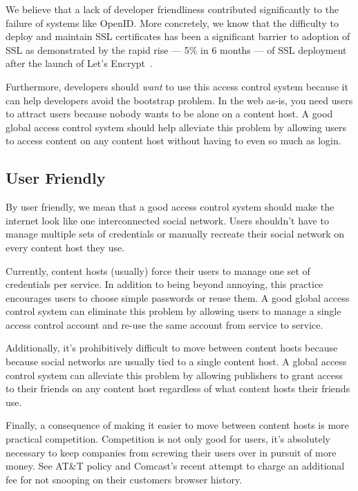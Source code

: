 \documentclass[pdftex,12pt,a4papaer]{report}
\begin{document}
We believe that a lack of developer friendliness contributed significantly to
the failure of systems like OpenID\cite{openid}. More concretely, we know that
the difficulty to deploy and maintain SSL certificates has been a significant
barrier to adoption of SSL as demonstrated by the rapid rise --- 5\% in 6 months
--- of SSL deployment after the launch of Let's Encrypt~\cite{lets-encrypt}.

Furthermore, developers should \emph{want} to use this access control system
because it can help developers avoid the bootstrap problem. In the web as-is,
you need users to attract users because nobody wants to be alone on a content
host. A good global access control system should help alleviate this problem by
allowing users to access content on any content host without having to even so
much as login.

\subsection{User Friendly}
\label{sub:goal-user}

By user friendly, we mean that a good access control system should make the
internet look like one interconnected social network. Users shouldn't have to
manage multiple sets of credentials or manually recreate their social network on
every content host they use.

Currently, content hosts (usually) force their users to manage one set of
credentials per service. In addition to being beyond annoying, this practice
encourages users to choose simple passwords or reuse them. A good global access
control system can eliminate this problem by allowing users to manage a single
access control account and re-use the same account from service to service.

Additionally, it's prohibitively difficult to move between content hosts because
because social networks are usually tied to a single content host. A global
access control system can alleviate this problem by allowing publishers to
grant access to their friends on any content host regardless of what content
hosts their friends use.

Finally, a consequence of making it easier to move between content hosts is
more practical competition. Competition is not only good for users, it's
absolutely necessary to keep companies from screwing their users over in pursuit
of more money. See AT\&T\texttrademark{}\cite{att} policy and
Comcast's\texttrademark{}\cite{comcast} recent attempt to charge an additional
fee for not snooping on their customers browser history.
\end{document}
